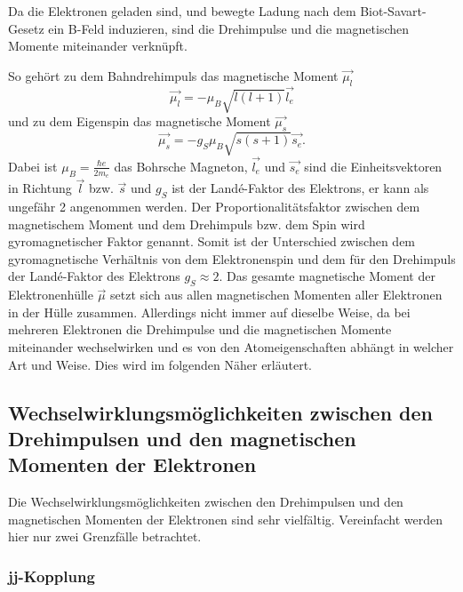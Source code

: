 
Da die Elektronen geladen sind, und bewegte Ladung nach dem Biot-Savart-Gesetz ein B-Feld induzieren, 
sind die Drehimpulse und die magnetischen Momente miteinander verknüpft.


So gehört zu dem Bahndrehimpuls das magnetische Moment $\vec{\mu_l}$
\begin{equation*}
    \vec{\mu_l} = - \mu_B \sqrt{l(l+1)} \vec{l_e}
\end{equation*}
und zu dem Eigenspin das magnetische Moment $\vec{\mu_s}$
\begin{equation*}
    \vec{\mu_s} = - g_S \mu_B \sqrt{s(s+1)} \vec{s_e}.
\end{equation*}
Dabei ist $\mu_B = \frac{\hbar e}{2 m_e}$ das Bohrsche Magneton, $\vec{l_e}$ und $ \vec{s_e}$ sind die 
Einheitsvektoren in Richtung $\vec{l}$ bzw. $\vec{s}$
und $g_S$ ist der Landé-Faktor des Elektrons, er kann als ungefähr 2 angenommen werden. 
Der Proportionalitätsfaktor zwischen dem magnetischem Moment und dem Drehimpuls bzw. dem Spin wird 
gyromagnetischer Faktor genannt. Somit ist der 
Unterschied zwischen dem gyromagnetische Verhältnis von dem Elektronenspin und dem für den Drehimpuls
der Landé-Faktor des Elektrons $g_S \approx 2$.
Das gesamte magnetische Moment der Elektronenhülle $\vec{\mu}$ setzt sich aus allen magnetischen 
Momenten aller Elektronen in der Hülle zusammen. Allerdings nicht immer auf dieselbe Weise, da 
bei mehreren Elektronen die Drehimpulse und die magnetischen Momente miteinander wechselwirken
und es von den Atomeigenschaften abhängt in welcher Art und Weise. Dies wird im folgenden Näher erläutert. 



\subsection{Wechselwirklungsmöglichkeiten zwischen den Drehimpulsen und den magnetischen Momenten der Elektronen}

Die Wechselwirklungsmöglichkeiten zwischen den Drehimpulsen und den magnetischen Momenten der Elektronen 
sind sehr vielfältig. 
Vereinfacht werden hier nur zwei Grenzfälle betrachtet.

\subsubsection{jj-Kopplung}

